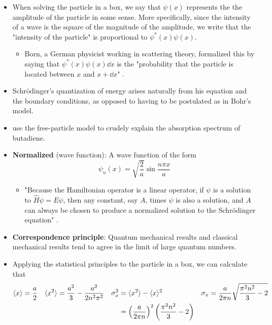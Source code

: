 \documentclass[../notes.tex]{subfiles}
\begin{document}
\begin{itemize}
    \item When solving the particle in a box, we say that $\psi(x)$ represents the the amplitude of the particle in some sense. More specifically, since the intensity of a wave is the square of the magnitude of the amplitude, we write that the "intensity of the particle" is proportional to $\psi^*(x)\psi(x)$.
    \begin{itemize}
        \item Born, a German physicist working in scattering theory, formalized this by saying that $\psi^*(x)\psi(x)\dd{x}$ is the "probability that the particle is located between $x$ and $x+\dd{x}$" \parencite[80]{bib:McQuarrieSimon}.
    \end{itemize}
    \item Schr\"{o}dinger's quantization of energy arises naturally from his equation and the boundary conditions, as opposed to having to be postulated as in Bohr's model.
    \item \textcite{bib:McQuarrieSimon} use the free-particle model to crudely explain the absorption spectrum of butadiene.
    \item \textbf{Normalized} (wave function): A wave function of the form
    \begin{equation*}
        \psi_n(x) = \sqrt{\frac{2}{a}}\sin\frac{n\pi x}{a}
    \end{equation*}
    \begin{itemize}
        \item "Because the Hamiltonian operator is a linear operator, if $\psi$ is a solution to $\hat{H}\psi=E\psi$, then any constant, say $A$, times $\psi$ is also a solution, and $A$ can always be chosen to produce a normalized solution to the Schr\"{o}dinger equation" \parencite[84]{bib:McQuarrieSimon}.
    \end{itemize}
    \item \textbf{Correspondence principle}: Quantum mechanical results and classical mechanical results tend to agree in the limit of large quantum numbers.
    \item Applying the statistical principles to the particle in a box, we can calculate that
    \begin{align*}
        \prb{x} &= \frac{a}{2}&
            \prb{x^2} &= \frac{a^2}{3}-\frac{a^2}{2n^2\pi^2}&
                \sigma_x^2 &= \prb{x^2}-\prb{x}^2&
                    \sigma_x &= \frac{a}{2\pi n}\sqrt{\frac{\pi^2n^2}{3}-2}\\
        &&
            &&
                &= \left( \frac{a}{2\pi n} \right)^2\left( \frac{\pi^2n^2}{3}-2 \right)

\end{align*}
\end{itemize}
\end{document}
